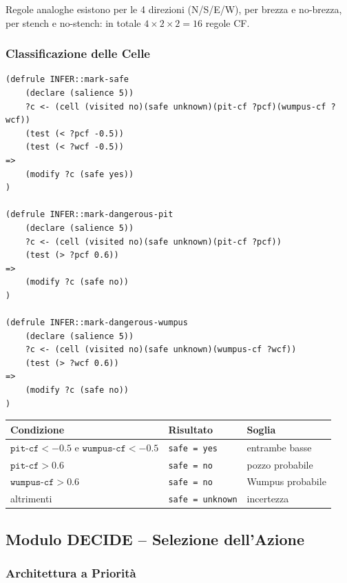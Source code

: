 \documentclass[12pt,a4paper]{article}
\begin{document}
Regole analoghe esistono per le 4 direzioni (N/S/E/W), per brezza e no-brezza,
per stench e no-stench: in totale $4 \times 2 \times 2 = 16$ regole CF.

\subsubsection{Classificazione delle Celle}

\begin{lstlisting}
(defrule INFER::mark-safe
    (declare (salience 5))
    ?c <- (cell (visited no)(safe unknown)(pit-cf ?pcf)(wumpus-cf ?wcf))
    (test (< ?pcf -0.5))
    (test (< ?wcf -0.5))
=>
    (modify ?c (safe yes))
)

(defrule INFER::mark-dangerous-pit
    (declare (salience 5))
    ?c <- (cell (visited no)(safe unknown)(pit-cf ?pcf))
    (test (> ?pcf 0.6))
=>
    (modify ?c (safe no))
)

(defrule INFER::mark-dangerous-wumpus
    (declare (salience 5))
    ?c <- (cell (visited no)(safe unknown)(wumpus-cf ?wcf))
    (test (> ?wcf 0.6))
=>
    (modify ?c (safe no))
)
\end{lstlisting}

\begin{center}
\begin{tabular}{lll}
\toprule
\textbf{Condizione} & \textbf{Risultato} & \textbf{Soglia} \\
\midrule
$\texttt{pit-cf} < -0.5$ e $\texttt{wumpus-cf} < -0.5$ & \texttt{safe = yes} & entrambe basse \\
$\texttt{pit-cf} > 0.6$ & \texttt{safe = no} & pozzo probabile \\
$\texttt{wumpus-cf} > 0.6$ & \texttt{safe = no} & Wumpus probabile \\
altrimenti & \texttt{safe = unknown} & incertezza \\
\bottomrule
\end{tabular}
\end{center}

\subsection{Modulo DECIDE -- Selezione dell'Azione}

\subsubsection{Architettura a Priorità}
\end{document}
